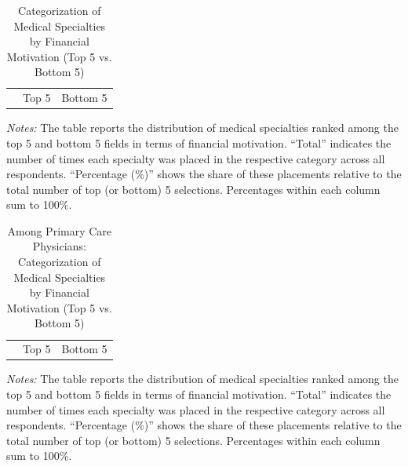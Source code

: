 \documentclass[11pt]{article}
\theoremstyle{definition}
\begin{document}
\begin{table}[H]
    \centering
    \caption{Categorization of Medical Specialties by Financial Motivation (Top 5 vs. Bottom 5)}
    \begin{adjustbox}{width=0.55\linewidth} 
    \begin{tabular}{lcccc}\toprule & \multicolumn{2}{c}{Top 5} & \multicolumn{2}{c}{Bottom 5} \\ \cmidrule(lr){2-3} \cmidrule(lr){4-5} 
    
    \end{tabular}
    \end{adjustbox}
    \label{tab:med_field_cat_finmov}
          {\parbox{1\linewidth}{           %
		\scriptsize{{{ \textit{Notes:} The table reports the distribution of medical specialties ranked among the top 5 and bottom 5 fields in terms of financial motivation. “Total” indicates the number of times each specialty was placed in the respective category across all respondents. “Percentage (\%)” shows the share of these placements relative to the total number of top (or bottom) 5 selections. Percentages within each column sum to 100\%.}}}}}
\end{table}

\begin{table}[H]
    \centering
    \caption{Among Primary Care Physicians: Categorization of Medical Specialties by Financial Motivation (Top 5 vs. Bottom 5)}
    \begin{adjustbox}{width=0.55\linewidth} 
    \begin{tabular}{lcccc}\toprule & \multicolumn{2}{c}{Top 5} & \multicolumn{2}{c}{Bottom 5} \\ \cmidrule(lr){2-3} \cmidrule(lr){4-5} 
    
    \end{tabular}
    \end{adjustbox}
    \label{tab:med_field_cat_finmov_pc}
          {\parbox{1\linewidth}{           %
		\scriptsize{{{ \textit{Notes:} The table reports the distribution of medical specialties ranked among the top 5 and bottom 5 fields in terms of financial motivation. “Total” indicates the number of times each specialty was placed in the respective category across all respondents. “Percentage (\%)” shows the share of these placements relative to the total number of top (or bottom) 5 selections. Percentages within each column sum to 100\%.}}}}}
\end{table}
\end{document}
